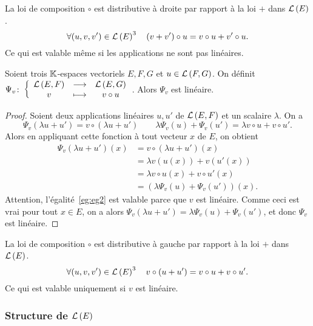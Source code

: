 \begin{cor}
  La loi de composition $\circ$ est distributive à droite par rapport à la loi $+$ dans $\mathcal{L}\left(E\right)$.
  \begin{equation}
    \forall (u,v,v') \in \mathcal{L}\left(E\right)^3 \quad (v+v') \circ u = v \circ u + v' \circ u.
  \end{equation}
  Ce qui est valable même si les applications ne sont pas linéaires.
\end{cor}

\begin{prop}
  Soient trois $\mathbb{K}$-espaces vectoriels $E,F,G$ et $u \in \mathcal{L}\left(F,G\right)$. On définit $\Psi_v\colon \left\{\begin{array}{ccc} \mathcal{L}\left(E,F\right) & \longrightarrow &\mathcal{L}\left(E,G\right)\\ v & \longmapsto & v \circ u \end{array} \right.$. Alors $\Psi_v$ est linéaire.
\end{prop}
\begin{proof}
  Soient deux applications linéaires $u,u'$ de $\mathcal{L}\left(E,F\right)$ et un scalaire $\lambda$. On a
  \begin{equation}
    \Psi_v(\lambda u+u')=v \circ (\lambda u+u') \qquad \lambda \Psi_v(u)+\Psi_v(u')=\lambda v \circ u + v \circ u'.
  \end{equation}
  Alors en appliquant cette fonction à tout vecteur $x$ de $E$, on obtient
  \begin{align}
    \Psi_v(\lambda u+u')(x)&=v \circ (\lambda u+u')(x) \\
    &=\lambda v(u(x)) + v(u'(x)) \label{eg:eg2}\\
    &=\lambda v\circ u(x) +v\circ u'(x) \\
    &=(\lambda \Psi_v(u)+\Psi_v(u'))(x).
  \end{align}
  Attention, l'égalité~\eqref{eg:eg2} est valable parce que $v$ est linéaire. Comme ceci est vrai pour tout $x \in E$, on a alors $\Psi_v(\lambda u+u')=\lambda \Psi_v(u)+\Psi_v(u')$, et donc $\Psi_v$ est linéaire.
\end{proof}
\begin{cor}
  La loi de composition $\circ$ est distributive à gauche par rapport à la loi $+$ dans $\mathcal{L}\left(E\right)$.
  \begin{equation}
    \forall (u,v,v') \in \mathcal{L}\left(E\right)^3 \quad v \circ (u+u') = v \circ u + v \circ u'.
  \end{equation}
  Ce qui est valable uniquement si $v$ est linéaire.
\end{cor}

\subsubsection{Structure de $\mathcal{L}\left(E\right)$}

